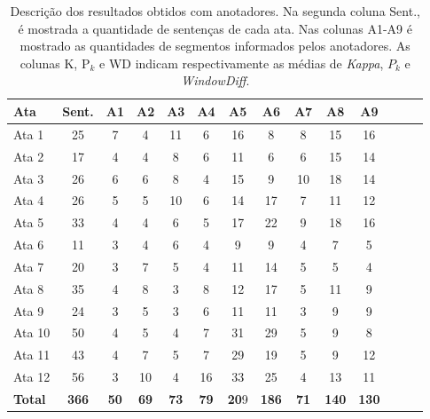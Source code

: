 \begin{table}[!h]
	\centering
	\begin{tabular}{|l|c|c|c|c|c|c|c|c|c|c|c|c|c|} \hline
		\textbf{Ata} & \textbf{Sent.}  & 
		\textbf{A1}  & 
		\textbf{A2}  & 
		\textbf{A3}  & 
		\textbf{A4}  & 
		\textbf{A5}  & 
		\textbf{A6}  & 
		\textbf{A7}  & 
		\textbf{A8}  & 
		\textbf{A9} 
		\\	\hline


		Ata 1  & 25 & 7  & 4  & 11 & 6  & 16 & 8  & 8  & 15 & 16 \\ \hline 
		Ata 2  & 17 & 4  & 4  & 8  & 6  & 11 & 6  & 6  & 15 & 14 \\ \hline 
		Ata 3  & 26 & 6  & 6  & 8  & 4  & 15 & 9  & 10 & 18 & 14 \\ \hline 
		Ata 4  & 26 & 5  & 5  & 10 & 6  & 14 & 17 & 7  & 11 & 12 \\ \hline 
		Ata 5  & 33 & 4  & 4  & 6  & 5  & 17 & 22 & 9  & 18 & 16 \\ \hline 
		Ata 6  & 11 & 3  & 4  & 6  & 4  & 9  & 9  & 4  & 7  &  5 \\ \hline 
		Ata 7  & 20 & 3  & 7  & 5  & 4  & 11 & 14 & 5  & 5  &  4 \\ \hline 
		Ata 8  & 35 & 4  & 8  & 3  & 8  & 12 & 17 & 5  & 11 &  9 \\ \hline 
		Ata 9  & 24 & 3  & 5  & 3  & 6  & 11 & 11 & 3  & 9  &  9 \\ \hline 
		Ata 10 & 50 & 4  & 5  & 4  & 7  & 31 & 29 & 5  & 9  &  8 \\ \hline 
		Ata 11 & 43 & 4  & 7  & 5  & 7  & 29 & 19 & 5  & 9  & 12 \\ \hline 
		Ata 12 & 56 & 3  & 10 & 4  & 16 & 33 & 25 & 4  & 13 & 11 \\ \hline 
		\textbf{Total} &
		\textbf{366} & 
		\textbf{50}&  
		\textbf{69} & 
		\textbf{73}&  
		\textbf{79}&  
		\textbf{20}9 & 
		\textbf{186}&  
		\textbf{71}&  
		\textbf{140}&  
		\textbf{130} 
		\\ \hline 

	\end{tabular}
	\caption{Descrição dos resultados obtidos com anotadores. Na segunda coluna Sent., é mostrada a quantidade de sentenças de cada ata. Nas colunas A1-A9 é mostrado as quantidades de segmentos informados pelos anotadores. As colunas K, P$_k$ e WD indicam respectivamente as médias de \textit{Kappa}, $P_k$ e \textit{WindowDiff}.} 

	\label{tab:ataseanotacoes}
\end{table}


